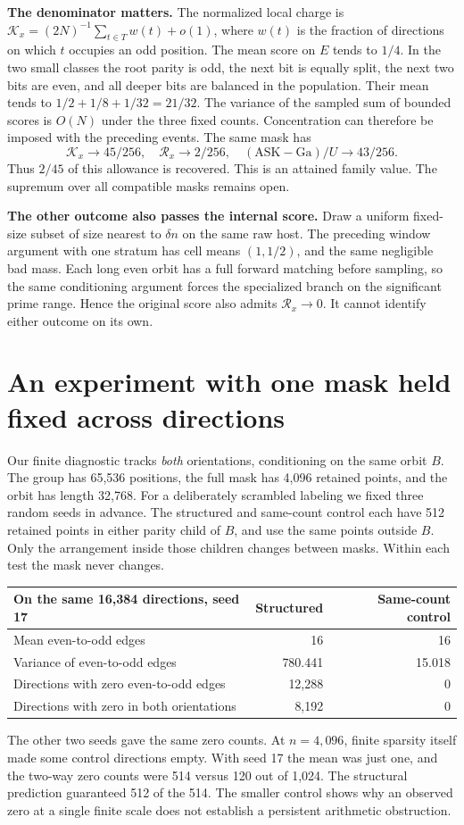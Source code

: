 \documentclass[12pt,letterpaper]{article}
\newcommand{\para}[1]{\par\medskip\noindent\textbf{#1}\quad}
\newcommand{\pagepart}[1]{\clearpage\section{#1}}
\begin{document}
\para{The denominator matters.} The normalized local charge is \(\mathcal K_x=(2N)^{-1}\sum_{t\in T}w(t)+o(1)\), where \(w(t)\) is the fraction of directions on which \(t\) occupies an odd position. The mean score on \(E\) tends to \(1/4\). In the two small classes the root parity is odd, the next bit is equally split, the next two bits are even, and all deeper bits are balanced in the population. Their mean tends to \(1/2+1/8+1/32=21/32\). The variance of the sampled sum of bounded scores is \(O(N)\) under the three fixed counts. Concentration can therefore be imposed with the preceding events. The same mask has
\[
 \mathcal K_x\longrightarrow45/256,\quad
 \mathcal R_x\longrightarrow2/256,\quad
 (\mathrm{ASK}-\mathrm{Ga})/U\longrightarrow43/256 .
\]
Thus \(2/45\) of this allowance is recovered. This is an attained family value. The supremum over all compatible masks remains open.

\para{The other outcome also passes the internal score.} Draw a uniform fixed-size subset of size nearest to \(\delta n\) on the same raw host. The preceding window argument with one stratum has cell means \((1,1/2)\), and the same negligible bad mass. Each long even orbit has a full forward matching before sampling, so the same conditioning argument forces the specialized branch on the significant prime range. Hence the original score also admits \(\mathcal R_x\to0\). It cannot identify either outcome on its own.

\pagepart{An experiment with one mask held fixed across directions}
Our finite diagnostic tracks \emph{both} orientations, conditioning on the same orbit \(B\). The group has 65,536 positions, the full mask has 4,096 retained points, and the orbit has length 32,768. For a deliberately scrambled labeling we fixed three random seeds in advance. The structured and same-count control each have 512 retained points in either parity child of \(B\), and use the same points outside \(B\). Only the arrangement inside those children changes between masks. Within each test the mask never changes.

\begin{center}\begin{tabular}{@{}lrr@{}}\toprule
On the same 16,384 directions, seed 17 & Structured & Same-count control\\\midrule
Mean even-to-odd edges & 16 & 16\\
Variance of even-to-odd edges & 780.441 & 15.018\\
Directions with zero even-to-odd edges & 12,288 & 0\\
Directions with zero in both orientations & 8,192 & 0\\\bottomrule
\end{tabular}\end{center}
The other two seeds gave the same zero counts. At \(n=4{,}096\), finite sparsity itself made some control directions empty. With seed 17 the mean was just one, and the two-way zero counts were 514 versus 120 out of 1,024. The structural prediction guaranteed 512 of the 514. The smaller control shows why an observed zero at a single finite scale does not establish a persistent arithmetic obstruction.
\end{document}
